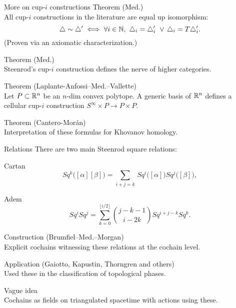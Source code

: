 \begin{frame}{More on cup-$i$ constructions}
	\pause
	\textcolor{pblue}{Theorem (Med.)} \\
	All cup-$i$ constructions in the literature are equal up isomorphism:
	\[
	\triangle \sim \triangle^\prime \iff \forall i \in \mathbb{N}, \ \triangle_i = \triangle_i^\prime \ \vee \, \triangle_i = T \triangle_i^\prime.
	\]
	(Proven via an axiomatic characterization.)

	\bigskip\pause
	\textcolor{pblue}{Theorem (Med.)} \\
	Steenrod's cup-$i$ construction defines the nerve of higher categories.

	\bigskip\pause
	\textcolor{pblue}{Theorem (Laplante-Anfossi--Med.--Vallette)} \\
	Let $P \subset \mathbb{R}^n$ be an $n$-dim convex polytope.
	A generic basis of $\mathbb{R}^n$ defines a cellular cup-$i$ construction $S^\infty \times P \to P \times P$.

	\bigskip\pause
	\textcolor{pblue}{Theorem (Cantero-Mor\'an)} \\
	Interpretation of these formulas for Khovanov homology.
\end{frame}

\begin{frame}{Relations}
	\pause
	There are two main Steenrod square relations:

	\bigskip\pause
	\textcolor{pblue}{Cartan}
	\vspace*{-5pt}
	\begin{equation*}
		Sq^k \big( [\alpha] [\beta] \big) =
		\sum_{i+j=k} \, Sq^i\big([\alpha]\big) Sq^j\big([\beta]\big),
	\end{equation*}

	\pause
	\textcolor{pblue}{Adem}
	\vspace*{-5pt}
	\begin{equation*}
		Sq^i Sq^j =
		\sum_{k=0}^{\lfloor i/2 \rfloor} \binom{j-k-1}{i-2k} Sq^{i+j-k} Sq^k.
	\end{equation*}

	\medskip\pause
	\textcolor{pblue}{Construction (Brumfiel--Med.--Morgan)} \\
	Explicit cochains witnessing these relations at the cochain level.

	\medskip\pause
	\textcolor{pblue}{Application (Gaiotto, Kapustin, Thorngren and others)} \\
	Used these in the classification of topological phases.

	\medskip\pause
	\textcolor{pblue}{Vague idea} \\
	Cochains as fields on triangulated spacetime with actions using these.
\end{frame}
